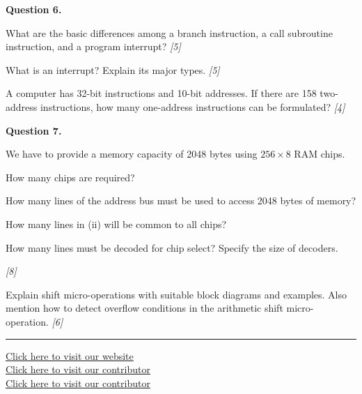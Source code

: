 \documentclass[11pt,a4paper]{article}
\newcommand{\pts}[1]{\hfill   \textit{[#1]}}
\begin{document}
\medskip


\noindent   \textbf{Question 6.}

\begin{parts}
  \item What are the basic differences among a branch instruction, a call subroutine instruction, and a program interrupt? \pts{5}
  \item What is an interrupt? Explain its major types. \pts{5}
  \item A computer has 32-bit instructions and 10-bit addresses. If there are 158 two-address instructions, how many one-address instructions can be formulated? \pts{4}
\end{parts}

\medskip


\noindent   \textbf{Question 7.}

\begin{parts}
  \item We have to provide a memory capacity of 2048 bytes using $256  \times 8$ RAM chips.
  
\begin{parts}
    \item How many chips are required?
    \item How many lines of the address bus must be used to access 2048 bytes of memory?
    \item How many lines in (ii) will be common to all chips?
    \item How many lines must be decoded for chip select? Specify the size of decoders.
  \end{parts} \pts{8}
  \item Explain shift micro-operations with suitable block diagrams and examples. Also mention how to detect overflow conditions in the arithmetic shift micro-operation. \pts{6}
\end{parts}

\vfill
\rule{\linewidth}{0.4pt}

\begin{center}\small
\href{https://bhu-exam.vercel.app/}{Click here to visit our website}\\[4pt]\href{https://me-aryan.vercel.app/}{Click here to visit our contributor}\\[4pt]\href{https://quashan-me.vercel.app/}{Click here to visit our contributor}
\end{center}
\end{document}
